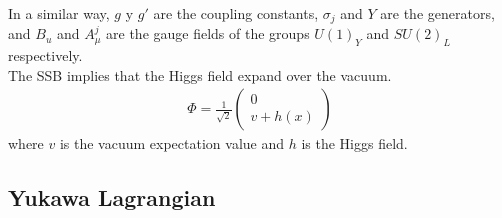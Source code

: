 In a similar way, $g$ y $g'$ are the coupling constants, $\sigma_{j}$ and $Y$ are the generators, and $B_{u}$ and $A^{j}_{\mu}$ are the gauge fields of the groups $U(1)_{Y}$ and $SU(2)_{L}$ respectively.\\
The SSB implies that the Higgs field expand over the vacuum.
\begin{eqnarray}
\Phi=\frac{1}{\sqrt{2}}\left(\begin{array}{c}
0\\
v+h(x)
\end{array}\right)
\end{eqnarray}
where $v$  is the vacuum expectation value and $h$ is the Higgs field.

\subsection{Yukawa Lagrangian}

